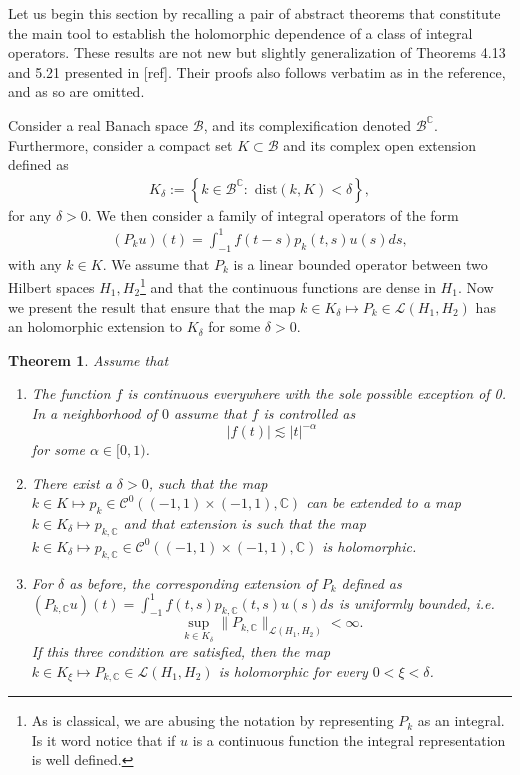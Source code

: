\documentclass{article}
\newtheorem{theorem}{Theorem}[section]
\newcommand{\todo}[1]{{\color{red}[#1]}}
\newcommand{\IC}{{\mathbb C}}
\newcommand{\cmspace}[3]{\mathcal{C}^{#1} \left( #2, #3 \right)}
\begin{document}
Let us begin this section by recalling a pair of abstract theorems that constitute the main tool to establish the holomorphic dependence of a class of integral operators. These results are not new but slightly generalization of  Theorems 4.13 and 5.21 presented in \todo{ref}. Their proofs also follows verbatim as in the reference, and as so are omitted.

Consider a real Banach space $\mathcal{B}$, and its complexification denoted $\mathcal{B}^{\IC}$. Furthermore, consider a compact set $K \subset \mathcal{B}$ and its complex open extension defined as 
\begin{align}
\label{eq:openext}
K_\delta :=  \left\lbrace k \in \mathcal{B}^{\IC} : \text{ dist}(k, K) < \delta \right\rbrace,
\end{align}
for any $\delta>0$. We then consider a family of integral operators of the form
\begin{align*}
(P_k u)(t) = \int_{-1}^{1} f(t-s) p_k(t,s) u(s) ds,
\end{align*}
with any $k \in K$. We assume that $P_k$ is a linear bounded operator between two Hilbert spaces $H_1,H_2$\footnote{As is classical, we are abusing the notation by representing $P_k$ as an integral. Is it word notice that if $u$ is a continuous function the integral representation is well defined.} and that the continuous functions are dense in $H_1$. Now we present the result that ensure that the map $k \in K_\delta \mapsto P_k \in \mathcal{L}(H_1,H_2)$ has an holomorphic extension to $K_\delta$ for some $\delta>0$. 

\begin{theorem} \label{thrm:abstractholm}
Assume that 
\begin{enumerate}
\item 
The function $f$ is continuous everywhere with the sole possible  exception of 0. In a neighborhood of $0$ assume that $f$ is controlled as 
$$|f(t)| \lesssim| t|^{-\alpha}$$
for some $\alpha \in [0,1)$. 
\item 
There exist a $\delta >0$, such that the map $k \in K \mapsto p_k \in \cmspace{0}{(-1,1)\times(-1,1)}{\IC}$ can be extended to a map $k \in K_\delta \mapsto p_{k,\IC}$ and that extension is such that 
the map $k \in K_\delta \mapsto p_{k,\IC } \in \cmspace{0}{(-1,1)\times(-1,1)}{\IC}$ is holomorphic. 
\item 
For $\delta$ as before, the corresponding extension of $P_k$ defined as $(P_{k,\IC}u)(t) = \int_{-1}^{1} f(t,s) p_{k,\IC}(t,s) u(s) ds$ is uniformly bounded, i.e. 
$$ \sup_{k \in K_\delta} \| P_{k,\IC} \|_{\mathcal{L}(H_1,H_2)}< \infty.$$
If this three condition are satisfied, then the map $k \in K_\xi \mapsto P_{k, \IC} \in \mathcal{L}(H_1,H_2)$ is holomorphic for every $0< \xi<\delta$.  
\end{enumerate}
\end{theorem}
\end{document}
